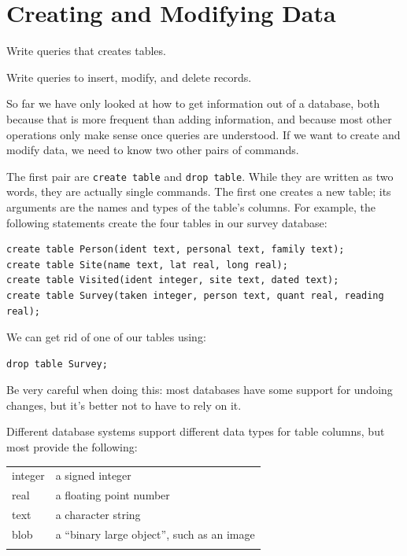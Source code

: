 \documentclass{book}
\begin{document}
\section{Creating and Modifying Data}

\begin{objectives}
\begin{swcitemize}
\item
  Write queries that creates tables.
\item
  Write queries to insert, modify, and delete records.
\end{swcitemize}
\end{objectives}

So far we have only looked at how to get information out of a database,
both because that is more frequent than adding information, and because
most other operations only make sense once queries are understood. If we
want to create and modify data, we need to know two other pairs of
commands.

The first pair are \texttt{create table} and \texttt{drop table}. While
they are written as two words, they are actually single commands. The
first one creates a new table; its arguments are the names and types of
the table's columns. For example, the following statements create the
four tables in our survey database:

\begin{verbatim}
create table Person(ident text, personal text, family text);
create table Site(name text, lat real, long real);
create table Visited(ident integer, site text, dated text);
create table Survey(taken integer, person text, quant real, reading real);
\end{verbatim}

We can get rid of one of our tables using:

\begin{verbatim}
drop table Survey;
\end{verbatim}

Be very careful when doing this: most databases have some support for
undoing changes, but it's better not to have to rely on it.

Different database systems support different data types for table
columns, but most provide the following:

\begin{tabular}{ll}
\hline\noalign{\medskip}
integer & a signed integer
\\\noalign{\medskip}
real & a floating point number
\\\noalign{\medskip}
text & a character string
\\\noalign{\medskip}
blob & a ``binary large object'', such as an image
\\\noalign{\medskip}
\hline
\end{tabular}
\end{document}
